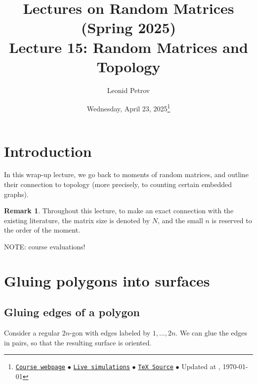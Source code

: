 \documentclass[letterpaper,11pt,oneside,reqno]{article}
\numberwithin{equation}{section}
\theoremstyle{definition}
\newtheorem{remark}[proposition]{Remark}
\begin{document}
\title{Lectures on Random Matrices
(Spring 2025)
\\Lecture 15: Random Matrices and Topology}


\date{Wednesday, April 23, 2025\footnote{\href{https://lpetrov.cc/rmt25/}{\texttt{Course webpage}}
$\bullet$ \href{https://lpetrov.cc/simulations/model/random-matrices/}{\texttt{Live simulations}}
$\bullet$ \href{https://lpetrov.cc/rmt25/rmt25-notes/rmt2025-l15.tex}{\texttt{TeX Source}}
$\bullet$
Updated at \currenttime, \today}}



\author{Leonid Petrov}


\maketitle
\tableofcontents


\section{Introduction}

In this wrap-up lecture, we go back to moments of random
matrices, and outline their connection to topology
(more precisely, to counting certain embedded graphs).

\begin{remark}
	Throughout this lecture, to make an exact connection with the existing literature,
	the matrix size is denoted by $N$, and the small $n$ is reserved to
	the order of the moment.
\end{remark}


\bigskip
{\huge{NOTE: course evaluations!}}

\section{Gluing polygons into surfaces}

\subsection{Gluing edges of a polygon}

Consider a regular $2n$-gon with edges labeled by $1,\ldots,2n$.
We can glue the edges in pairs, so that the resulting
surface is oriented.
\end{document}

